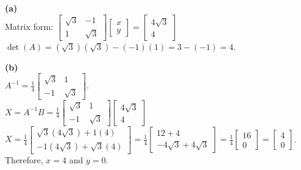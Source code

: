 \begin{solution}
\textbf{(a)} \\
Matrix form: $\begin{bmatrix} \sqrt{3} & -1 \\ 1 & \sqrt{3} \end{bmatrix} \begin{bmatrix} x \\ y \end{bmatrix} = \begin{bmatrix} 4\sqrt{3} \\ 4 \end{bmatrix}$ \\
$\det(A) = (\sqrt{3})(\sqrt{3}) - (-1)(1) = 3 - (-1) = 4$.

\medskip
\textbf{(b)} \\
$A^{-1} = \frac{1}{4}\begin{bmatrix} \sqrt{3} & 1 \\ -1 & \sqrt{3} \end{bmatrix}$. \\
$X = A^{-1}B = \frac{1}{4}\begin{bmatrix} \sqrt{3} & 1 \\ -1 & \sqrt{3} \end{bmatrix}\begin{bmatrix} 4\sqrt{3} \\ 4 \end{bmatrix}$ \\
$X = \frac{1}{4}\begin{bmatrix} \sqrt{3}(4\sqrt{3}) + 1(4) \\ -1(4\sqrt{3}) + \sqrt{3}(4) \end{bmatrix} = \frac{1}{4}\begin{bmatrix} 12 + 4 \\ -4\sqrt{3} + 4\sqrt{3} \end{bmatrix} = \frac{1}{4}\begin{bmatrix} 16 \\ 0 \end{bmatrix} = \begin{bmatrix} 4 \\ 0 \end{bmatrix}$. \\
Therefore, $x = 4$ and $y = 0$.


\end{solution}
